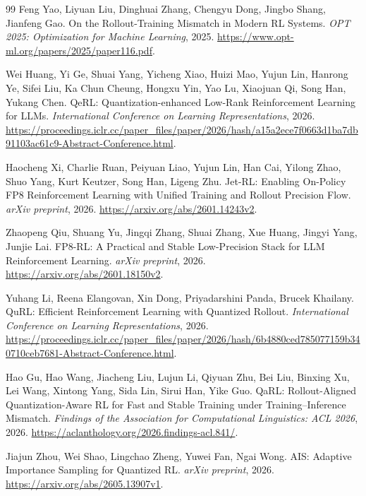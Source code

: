 \begingroup\small\raggedright
\begin{thebibliography}{99}
 Feng Yao, Liyuan Liu, Dinghuai Zhang, Chengyu Dong, Jingbo Shang, Jianfeng Gao. On the Rollout-Training Mismatch in Modern RL Systems. \emph{OPT 2025: Optimization for Machine Learning}, 2025. \url{https://www.opt-ml.org/papers/2025/paper116.pdf}.

 Wei Huang, Yi Ge, Shuai Yang, Yicheng Xiao, Huizi Mao, Yujun Lin, Hanrong Ye, Sifei Liu, Ka Chun Cheung, Hongxu Yin, Yao Lu, Xiaojuan Qi, Song Han, Yukang Chen. QeRL: Quantization-enhanced Low-Rank Reinforcement Learning for LLMs. \emph{International Conference on Learning Representations}, 2026. \url{https://proceedings.iclr.cc/paper_files/paper/2026/hash/a15a2ece7f0663d1ba7db91103ac61c9-Abstract-Conference.html}.

 Haocheng Xi, Charlie Ruan, Peiyuan Liao, Yujun Lin, Han Cai, Yilong Zhao, Shuo Yang, Kurt Keutzer, Song Han, Ligeng Zhu. Jet-RL: Enabling On-Policy FP8 Reinforcement Learning with Unified Training and Rollout Precision Flow. \emph{arXiv preprint}, 2026. \url{https://arxiv.org/abs/2601.14243v2}.

 Zhaopeng Qiu, Shuang Yu, Jingqi Zhang, Shuai Zhang, Xue Huang, Jingyi Yang, Junjie Lai. FP8-RL: A Practical and Stable Low-Precision Stack for LLM Reinforcement Learning. \emph{arXiv preprint}, 2026. \url{https://arxiv.org/abs/2601.18150v2}.

 Yuhang Li, Reena Elangovan, Xin Dong, Priyadarshini Panda, Brucek Khailany. QuRL: Efficient Reinforcement Learning with Quantized Rollout. \emph{International Conference on Learning Representations}, 2026. \url{https://proceedings.iclr.cc/paper_files/paper/2026/hash/6b4880ced785077159b340710ceb7681-Abstract-Conference.html}.

 Hao Gu, Hao Wang, Jiacheng Liu, Lujun Li, Qiyuan Zhu, Bei Liu, Binxing Xu, Lei Wang, Xintong Yang, Sida Lin, Sirui Han, Yike Guo. QaRL: Rollout-Aligned Quantization-Aware RL for Fast and Stable Training under Training--Inference Mismatch. \emph{Findings of the Association for Computational Linguistics: ACL 2026}, 2026. \url{https://aclanthology.org/2026.findings-acl.841/}.

 Jiajun Zhou, Wei Shao, Lingchao Zheng, Yuwei Fan, Ngai Wong. AIS: Adaptive Importance Sampling for Quantized RL. \emph{arXiv preprint}, 2026. \url{https://arxiv.org/abs/2605.13907v1}.


\end{thebibliography}
